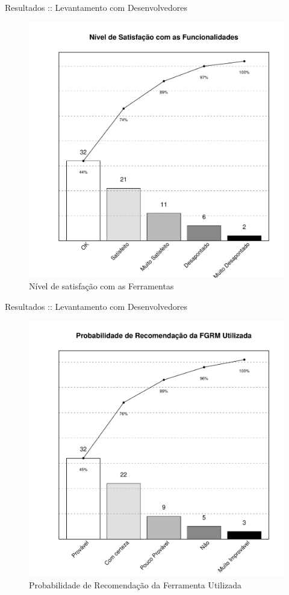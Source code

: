\documentclass[t,14pt,mathserif]{beamer}
\begin{document}
\begin{frame}{Resultados :: Levantamento com Desenvolvedores}

\begin{figure}[htpb] \centering
    \includegraphics[width=0.5\linewidth]{../img/grafico_melhorias_fgrm_nivel_satisfacao.pdf}
    \caption{Nível de satisfação com as Ferramentas}
\label{fig:grafico_melhorias_fgrm_nivel_satisfacao}
\end{figure}

\end{frame}

\begin{frame}{Resultados :: Levantamento com Desenvolvedores}

\begin{figure}[htpb]
	\centering
	\includegraphics[width=0.45\linewidth]{../img/grafico_melhorias_fgrm_probabilidade_recomentacao.pdf}
	\caption{Probabilidade de Recomendação da Ferramenta Utilizada}
\label{fig:grafico_melhorias_fgrm_probabilidade_recomentacao}
\end{figure}

\end{frame}
\end{document}
